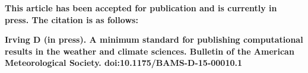 \textbf{This article has been accepted for publication and is currently in press. The citation is as follows:}    

\textbf{Irving D (in press). A minimum standard for publishing computational results in the weather and climate sciences. Bulletin of the American Meteorological Society. doi:10.1175/BAMS-D-15-00010.1}